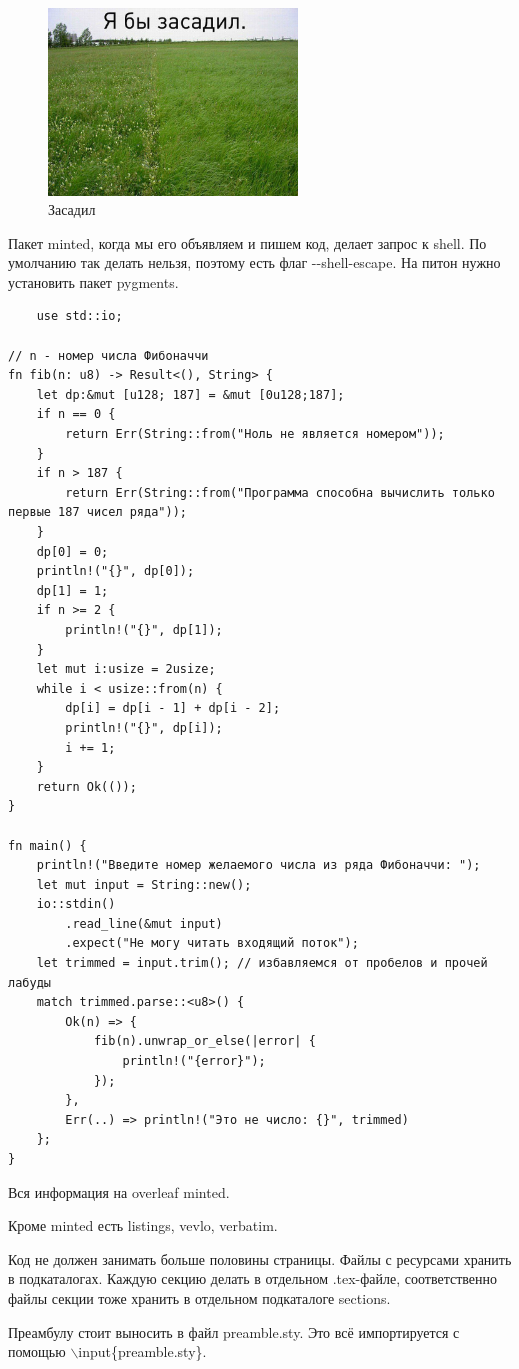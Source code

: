 \documentclass{article}
\begin{document}
\begin{figure}[H] %
    \centering
    \label{figure:zasadil}
    \caption{Засадил}
    \includegraphics[width=250px]{surovikin.jpg}
\end{figure}
Пакет minted, когда мы его объявляем и пишем код, делает запрос к shell. По умолчанию так делать нельзя, поэтому есть флаг -\--shell-escape. На питон нужно установить пакет pygments. 
\begin{verbatim}
    use std::io;

// n - номер числа Фибоначчи
fn fib(n: u8) -> Result<(), String> {
    let dp:&mut [u128; 187] = &mut [0u128;187];
    if n == 0 {
        return Err(String::from("Ноль не является номером"));
    }
    if n > 187 {
        return Err(String::from("Программа способна вычислить только первые 187 чисел ряда"));
    }
    dp[0] = 0;
    println!("{}", dp[0]);
    dp[1] = 1;
    if n >= 2 {
        println!("{}", dp[1]);
    }
    let mut i:usize = 2usize;
    while i < usize::from(n) {
        dp[i] = dp[i - 1] + dp[i - 2];
        println!("{}", dp[i]);
        i += 1;
    }
    return Ok(());
}

fn main() {
    println!("Введите номер желаемого числа из ряда Фибоначчи: ");
    let mut input = String::new();
    io::stdin()
        .read_line(&mut input)
        .expect("Не могу читать входящий поток");
    let trimmed = input.trim(); // избавляемся от пробелов и прочей лабуды
    match trimmed.parse::<u8>() {
        Ok(n) => {
            fib(n).unwrap_or_else(|error| {
                println!("{error}");
            });
        },
        Err(..) => println!("Это не число: {}", trimmed)
    };
}
\end{verbatim}
Вся информация на overleaf minted.

Кроме minted есть listings, vevlo, verbatim.

Код не должен занимать больше половины страницы. Файлы с ресурсами хранить в подкаталогах. Каждую секцию делать в отдельном .tex-файле, соответственно файлы секции тоже хранить в отдельном подкаталоге sections.

Преамбулу стоит выносить в файл preamble.sty. Это всё импортируется с помощью $\backslash $input\{preamble.sty\}.
\end{document}
